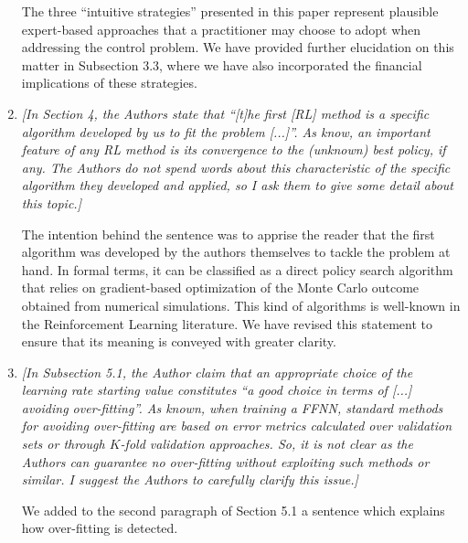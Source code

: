 \documentclass{article}
\newcommand{\quotations}[1]{``#1''}
\begin{document}
\begin{enumerate}
 The three \quotations{intuitive strategies} presented in this paper represent plausible expert-based approaches that a practitioner may choose to adopt when addressing the control problem. We have provided further elucidation on this matter in Subsection 3.3, where we have also incorporated the financial implications of these strategies.
 
 \item \textit{[In Section 4, the Authors state that ``[t]he first [RL] method is a specific algorithm developed by us to fit the problem [...]''. As know, an important feature of any RL method is its convergence to the (unknown) best policy, if any. The Authors do not spend words about this characteristic of the specific algorithm they developed and applied, so I ask them to give some detail about this topic.]} 
 
 The intention behind the sentence was to apprise the reader that the first algorithm was developed by the authors themselves to tackle the problem at hand. In formal terms, it can be classified as a direct policy search algorithm that relies on gradient-based optimization of the Monte Carlo outcome obtained from numerical simulations. This kind of algorithms is well-known in the Reinforcement Learning literature. We have revised this statement to ensure that its meaning is conveyed with greater clarity. 

 \item \textit{[In Subsection 5.1, the Author claim that an appropriate choice of the learning rate starting value constitutes ``a good choice in terms of [...] avoiding over-fitting''. As known, when training a FFNN, standard methods for avoiding over-fitting are based on error metrics calculated over validation sets or through $K$-fold validation approaches. So, it is not clear as the Authors can guarantee no over-fitting without exploiting such methods or similar. I suggest the Authors to carefully clarify this issue.]} 
 
We added to the second paragraph of Section 5.1 a sentence which explains how over-fitting is detected.

 \end{enumerate}
\end{document}
